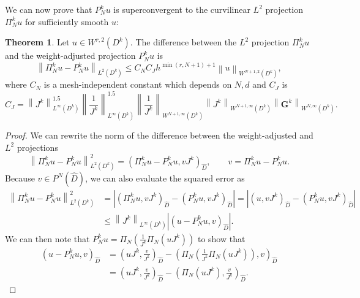 \documentclass[preprint,10pt]{article}
\theoremstyle{definition}
\theoremstyle{lemma}
\theoremstyle{theorem}
\newtheorem{theorem}{Theorem}
\theoremstyle{assumption}
\renewcommand{\hat}{\widehat}
\newcommand{\nor}[1]{\left\| #1 \right\|}
\newcommand{\LRp}[1]{\left( #1 \right)}
\newcommand{\LRb}[1]{\left| #1 \right|}
\begin{document}
{We can now prove that $P_N^k u$ is superconvergent to the curvilinear $L^2$ projection $\Pi_N^k u$ for sufficiently smooth $u$:
\begin{theorem}
Let $u \in W^{r,2}\LRp{D^k}$.  The difference between the $L^2$ projection $\Pi^k_Nu$ and the weight-adjusted projection $P_N^k u$ is
\[
\nor{\Pi_N^k u - P_N^k  u}_{L^2\LRp{D^k}} \leq C_N C_J h^{\min\LRp{r,N+1}+1}\nor{u}_{W^{N+1,2}\LRp{D^k}},
\]
where $C_N$ is a mesh-independent constant which depends on $N, d$ and $C_J$ is
\[
C_J = \nor{J^k}_{L^{\infty}\LRp{D^k}}^{1.5}  \nor{\frac{1}{J^k}}_{L^{\infty}\LRp{D^k}}^{1.5} \nor{\frac{1}{J^k}}_{W^{N+1,\infty}\LRp{D^k}}\nor{J^k}_{W^{N+1,\infty}\LRp{D^k}}\nor{\bm{G}^k}_{W^{N,\infty}\LRp{D^k}}.
\]
\label{thm:superconverge}
\end{theorem}
\begin{proof}
We can rewrite the norm of the difference between the weight-adjusted and $L^2$ projections
\[
\nor{\Pi_N^k  u - P_N^k  u}_{L^2\LRp{D^k}}^2 = \LRp{\Pi_N^k  u - P_N^k  u,vJ^k}_{\hat{D}}, \qquad v = \Pi_N^k  u - P_N^k  u.
\]
Because $v \in P^N\LRp{\hat{D}}$, we can also evaluate the squared error as
\begin{align*}
\nor{\Pi_N^k  u - P_N^k  u}_{L^2\LRp{D^k}}^2 &= \LRb{\LRp{\Pi_N^k u,vJ^k}_{\hat{D}} - \LRp{P_N^k  u,vJ^k}_{\hat{D}}} = \LRb{\LRp{u,vJ^k}_{\hat{D}} - \LRp{P_N^k  u,vJ^k}_{\hat{D}}} \\
&\leq \nor{J^k}_{L^{\infty}\LRp{D^k}} \LRb{\LRp{u-P_N^ku,v}_{\hat{D}}}.%
\end{align*}
We can then note that $P_N^ku = \Pi_N\LRp{\frac{1}{J^k} \Pi_N\LRp{uJ^k}}$ to show that
\begin{align*}
{\LRp{u-P_N^ku,v}_{\hat{D}}} &= {\LRp{uJ^k,\frac{v}{J^k}}_{\hat{D}}-\LRp{\Pi_N\LRp{\frac{1}{J^k} \Pi_N\LRp{uJ^k}},v}_{\hat{D}}} \\
&= \LRp{uJ^k,\frac{v}{J^k}}_{\hat{D}}-\LRp{\Pi_N\LRp{uJ^k},\frac{v}{J^k}}_{\hat{D}}. %
\end{align*}

\end{proof}}
\end{document}

